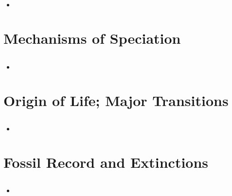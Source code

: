 \documentclass[12pt,a4paper]{article}
\begin{document}
\subsection{}
\begin{itemize}
    \item 
\end{itemize}

\clearpage
\setcounter{section}{15}
\section{Mechanisms of Speciation}
\subsection{}
\begin{itemize}
    \item 
\end{itemize}

\clearpage
\section{Origin of Life; Major Transitions}
\subsection{}
\begin{itemize}
    \item 
\end{itemize}

\clearpage
\section{Fossil Record and Extinctions}
\subsection{}
\begin{itemize}
    \item 
\end{itemize}
\end{document}
